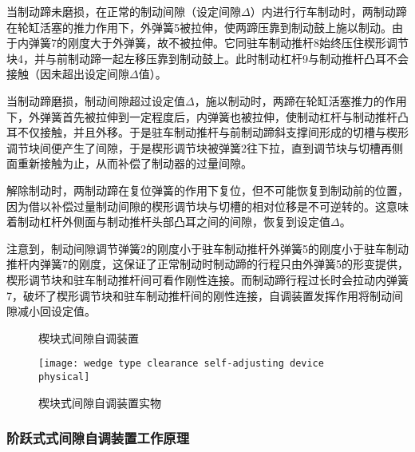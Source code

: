 \documentclass[UTF8]{ctexart}
\numberwithin{figure}{section}
\numberwithin{table}{section}
\begin{document}
当制动蹄未磨损，在正常的制动间隙（设定间隙$\Delta$）内进行行车制动时，两制动蹄在轮缸活塞的推力作用下，外弹簧5被拉伸，使两蹄压靠到制动鼓上施以制动。由于内弹簧7的刚度大于外弹簧，故不被拉伸。它同驻车制动推杆8始终压住楔形调节块4，并与前制动蹄一起左移压靠到制动鼓上。此时制动杠杆9与制动推杆凸耳不会接触（因未超出设定间隙$\Delta$值）。

当制动蹄磨损，制动间隙超过设定值$\Delta$，施以制动时，两蹄在轮缸活塞推力的作用下，外弹簧首先被拉伸到一定程度后，内弹簧也被拉伸，使制动杠杆与制动推杆凸耳不仅接触，并且外移。于是驻车制动推杆与前制动蹄斜支撑间形成的切槽与楔形调节块间便产生了间隙，于是楔形调节块被弹簧2往下拉，直到调节块与切槽再侧面重新接触为止，从而补偿了制动器的过量间隙。

解除制动时，两制动蹄在复位弹簧的作用下复位，但不可能恢复到制动前的位置，因为借以补偿过量制动间隙的楔形调节块与切槽的相对位移是不可逆转的。这意味着制动杠杆外侧面与制动推杆头部凸耳之间的间隙，恢复到设定值$\Delta$。

注意到，制动间隙调节弹簧2的刚度小于驻车制动推杆外弹簧5的刚度小于驻车制动推杆内弹簧7的刚度，这保证了正常制动时制动蹄的行程只由外弹簧5的形变提供，楔形调节块和驻车制动推杆间可看作刚性连接。而制动蹄行程过长时会拉动内弹簧7，破坏了楔形调节块和驻车制动推杆间的刚性连接，自调装置发挥作用将制动间隙减小回设定值。

\begin{figure}[htbp]
	\centering
	\begin{minipage}[b]{0.8\textwidth}
		\centering
		\caption{楔块式间隙自调装置}
		\label{wedge type clearance self-adjusting device}
	\end{minipage}
	\begin{minipage}[b]{0.5\textwidth}
		\centering
		\texttt{[image: wedge type clearance self-adjusting device physical]}
		\caption{楔块式间隙自调装置实物}
		\label{wedge type clearance self-adjusting device physical}
	\end{minipage}
\end{figure}

\subsubsection{阶跃式式间隙自调装置工作原理}
\end{document}

